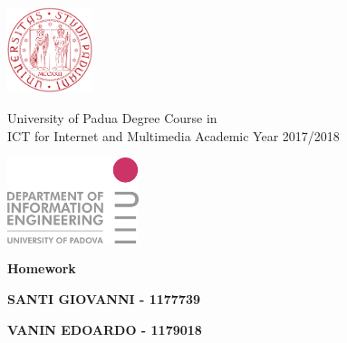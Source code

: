\documentclass[a4paper,11pt,openright,twoside]{report}
\begin{document}
\begin{minipage}[b]{0.20\textwidth}    %
	\centering
	\includegraphics[height=2.5cm]{images/unipd}
\end{minipage}%
\begin{minipage}[b][2cm]{0.6\textwidth}
	\centering\large \sc
	University of Padua \vfill
	Degree Course in \\ ICT for Internet and Multimedia\vfill
	\small Academic Year 2017/2018 \end{minipage}%
\begin{minipage}[b]{0.20\textwidth}
	\centering 
	\includegraphics[height=2.5cm]{images/dei}
\end{minipage}

\vspace*{20pt}
\begin{center}\leavevmode
	\normalfont
	{\huge\raggedleft \bfseries\textsf{  Homework}\par}%
	\hrulefill\par
	{\LARGE\raggedright \textsf{\bfseries SANTI GIOVANNI - 1177739}\par}%
	\vspace*{20pt}
	{\LARGE\raggedright \textsf{\bfseries VANIN EDOARDO - 1179018}\par}%
	\vspace*{20pt}
\end{center}	
	
\end{document}
